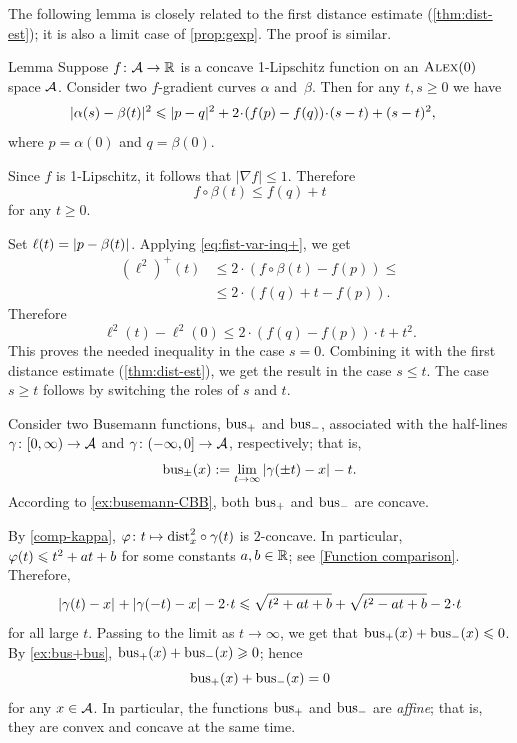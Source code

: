The following lemma is closely related to the first distance estimate (\ref{thm:dist-est});
it is also a limit case of \ref{prop:gexp}.
The proof is similar.

\begin{thm}{Lemma}\label{lem:dist-estimate}
Suppose $f\colon\mathcal{A}\to\mathbb{R}$ is a concave 1-Lipschitz function on an $\textup{\textsc{Alex}}(0)$ space $\mathcal{A}$.
Consider two $f$-gradient curves $\alpha$ and~$\beta$.
Then for any $t, s\ge 0$ we have
\begin{align*}
&\dist[2]{\alpha(s)}{\beta(t)}{}
\le 
\dist[2]{p}{q}{}+
2\cdot(f(p)-f(q))\cdot(s-t)+ (s-t)^2,
\end{align*}
where $p=\alpha(0)$ and $q=\beta(0)$.
\end{thm}

Since $f$ is 1-Lipschitz, it follows that $|\nabla f|\le1$.
Therefore 
\[f\circ\beta(t)\le f(q)+t\]
for any $t\ge0$.

Set $\ell(t)=\dist{p}{\beta(t)}{}$.
Applying \ref{eq:fist-var-inq+}, we get
\begin{align*}
(\ell^2)^+(t)
&\le 2\cdot \left(f\circ\beta(t)-f(p)\right)\le 
\\
&\le2\cdot\left(f(q)+t-f(p)\right).
\end{align*}
Therefore 
\[\ell^2(t)-\ell^2(0)\le 2\cdot\left(f(q)-f(p)\right)\cdot t + t^2.\]
This proves the needed inequality in the case $s=0$.
Combining it with the first distance estimate (\ref{thm:dist-est}), we get the result in the case $s\le t$.
The case $s\ge t$ follows by switching the roles of $s$ and $t$.
\qeds


 Consider two Busemann functions, $\operatorname{\rm bus}\nolimits_+$ and $\operatorname{\rm bus}\nolimits_-$, associated with the half-lines $\gamma\colon[0,\infty)\to \mathcal{A}$ and $\gamma\colon(-\infty,0]\to \mathcal{A}$, respectively; that is,
\[
\bus_\pm(x)
\df
\lim_{t\to\infty}\dist{\gamma(\pm t)}{x}{}- t.
\]
According to \ref{ex:busemann-CBB}, 
both $\operatorname{\rm bus}\nolimits_+$ and $\operatorname{\rm bus}\nolimits_-$ are concave.

By \ref{comp-kappa},
$\varphi\colon t\mapsto\mathrm{dist}_x^2\circ\gamma(t)$
is $2$-concave.
In particular, $\phi(t)\z\le t^2+at+b$ for some constants $a,b\in\mathbb{R}$; see \ref{Function comparison}.
Therefore,
\[
\dist{\gamma( t)}{x}{}+\dist{\gamma(- t)}{x}{}- 2\cdot t
\le \sqrt{ t^2+at+b}+\sqrt{ t^2-at+b}-2\cdot t
\]
for all large $t$.
Passing to the limit as $t\to\infty$, we get that $\bus_+(x)\z+\bus_-(x)\le 0$.
By \ref{ex:bus+bus}, $\operatorname{\rm bus}\nolimits_+(x)+\operatorname{\rm bus}\nolimits_-(x)\geqslant0$; hence
\[
\operatorname{\rm bus}\nolimits_+(x)+\operatorname{\rm bus}\nolimits_-(x)= 0
\]
for any $x\in \mathcal{A}$.
In particular, the functions $\operatorname{\rm bus}\nolimits_+$ and $\operatorname{\rm bus}\nolimits_-$ are \emph{affine};
that is, they are convex and concave at the same time.

